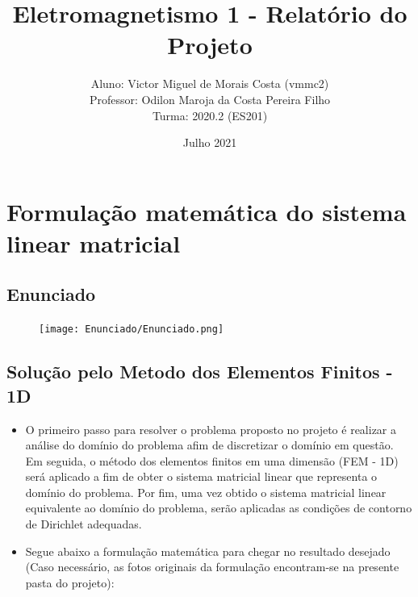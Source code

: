 \documentclass[10pt]{article}
\title{\vspace{8.0cm} \Huge \textbf{Eletromagnetismo 1 - Relatório do Projeto}}
\author{
Aluno: Victor Miguel de Morais Costa (vmmc2) \\
Professor: Odilon Maroja da Costa Pereira Filho \\
Turma: 2020.2 (ES201)
}
\date{Julho 2021}
\begin{document}
\maketitle

\newpage
{}

\section{Formulação matemática do sistema linear matricial}

    \subsection{Enunciado}
    \begin{figure}[ht]
    \centerline{\texttt{[image: Enunciado/Enunciado.png]}}
    \label{fig:dale}
    \end{figure}

    \subsection{Solução pelo Metodo dos Elementos Finitos - 1D}
    \begin{itemize}
    \item O primeiro passo para resolver o problema proposto no projeto é realizar a análise do domínio do problema afim de discretizar o domínio em questão. Em seguida, o método dos elementos finitos em uma dimensão (FEM - 1D) será aplicado a fim de obter o sistema matricial linear que representa o domínio do problema. Por fim, uma vez obtido o sistema matricial linear equivalente ao domínio do problema, serão aplicadas as condições de contorno de Dirichlet adequadas.
    \item Segue abaixo a formulação matemática para chegar no resultado desejado (Caso necessário, as fotos originais da formulação encontram-se na presente pasta do projeto):
    \end{itemize}
    
\end{document}
